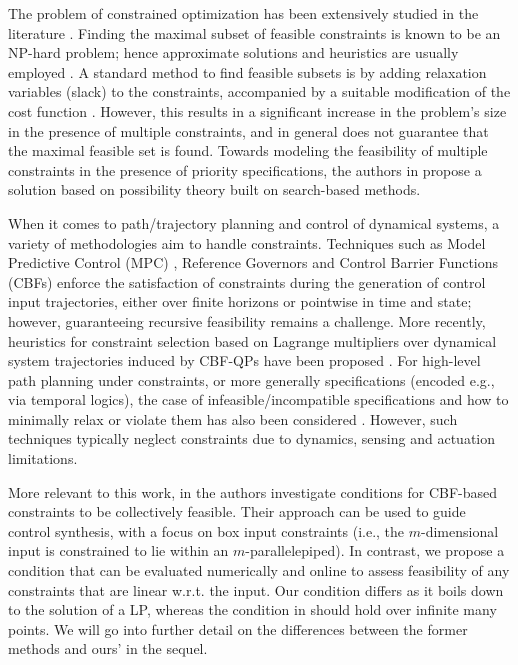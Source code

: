 \documentclass[letterpaper, 10 pt, conference]{ieeeconf}  %
\begin{document}
The problem of constrained optimization has been extensively studied in the literature \cite{book_optim}. Finding the maximal subset of feasible constraints \cite{chinneck} is known to be an NP-hard problem; hence approximate solutions and heuristics are usually employed \cite{782859,Chinneck2010-qg}. A standard method to find feasible subsets is by adding relaxation variables (slack) to the constraints, accompanied by a suitable modification of the cost function \cite{Chinneck1996}. However, this results in a significant increase in the problem's size in the presence of multiple constraints, and in general does not guarantee that the maximal feasible set is found. Towards modeling the feasibility of multiple constraints in the presence of priority specifications, the authors in \cite{Dubois1996} propose a solution based on possibility theory built on search-based methods. 
\par
When it comes to path/trajectory planning and control of dynamical systems, a variety of methodologies aim to handle constraints. Techniques such as Model Predictive Control (MPC) \cite{Schwenzer2021}, Reference Governors \cite{GARONE2017306} and Control Barrier Functions (CBFs) \cite{ames2016control} enforce the satisfaction of constraints during the generation of control input trajectories, either over finite horizons or pointwise in time and state; however, guaranteeing recursive feasibility remains a challenge. More recently, heuristics for constraint selection based on Lagrange multipliers over dynamical system trajectories induced by CBF-QPs have been proposed \cite{hardik2024}. For high-level path planning under constraints, or more generally specifications (encoded e.g., via temporal logics), the case of infeasible/incompatible specifications and how to minimally relax or violate them has also been considered \cite{Rahmani2020WhatTD, 7989177, Wongpiromsarn2020MinimumViolationPF, 6579837,10342094, 10.1145/3450267.3450542}. However, such techniques typically neglect constraints due to dynamics, sensing and actuation limitations.
\par 
{\color{blue}More relevant to this work, in \cite{Molnar,cohen2025compatibilitymultiplecontrolbarrier} the authors investigate conditions for CBF-based constraints to be collectively feasible. Their approach can be used to guide control synthesis, with a focus on box input constraints (i.e., the $m$-dimensional input is constrained to lie within an $m$-parallelepiped). In contrast, we propose a condition that can be evaluated numerically and online to assess feasibility of any constraints that are linear w.r.t. the input. Our condition differs as it boils down to the solution of a LP, whereas the condition in \cite{Molnar} should hold over infinite many points. We will go into further detail on the differences between the former methods and ours' in the sequel.}
\end{document}
